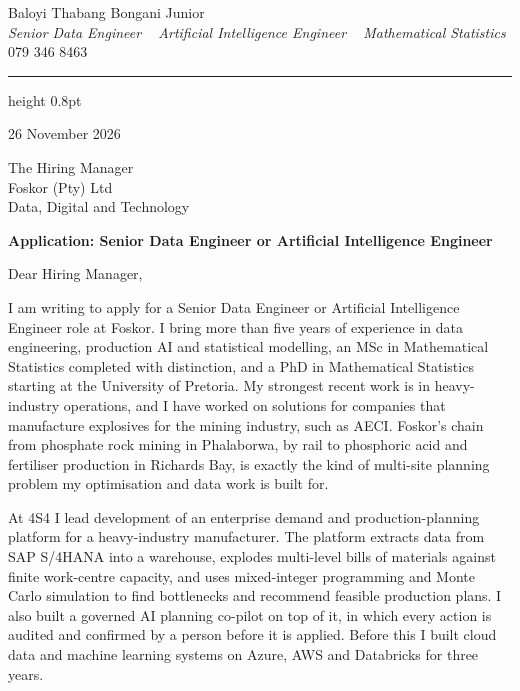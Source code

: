 \documentclass[a4paper,11pt]{article}
\begin{document}
\begin{center}
    {\huge Baloyi Thabang Bongani Junior} \\ \vspace{2pt}
    {\large\textit{Senior Data Engineer \textbar~ Artificial Intelligence Engineer \textbar~ Mathematical Statistics}} \\ \vspace{4pt}
    {079 346 8463} ~\textbar~
    \href{mailto:Baloyibongani1@gmail.com}{\color{blue}{Baloyibongani1@gmail.com}} ~\textbar~
    \href{https://www.linkedin.com/in/thabang-bongani-junior-baloyi-2622b0286/}{\color{blue}{LinkedIn}} ~\textbar~
    \href{https://github.com/thabangTheActuaryCoder}{\color{blue}{GitHub}}
\end{center}
{\color{airforceblue}\hrule height 0.8pt}

\vspace{6pt}
26 November 2026

The Hiring Manager \\
Foskor (Pty) Ltd \\
Data, Digital and Technology

\textbf{Application: Senior Data Engineer or Artificial Intelligence Engineer}

Dear Hiring Manager,

I am writing to apply for a Senior Data Engineer or Artificial Intelligence Engineer role at
Foskor. I bring more than five years of experience in data engineering, production AI and
statistical modelling, an MSc in Mathematical Statistics completed with distinction, and a PhD in
Mathematical Statistics starting at the University of Pretoria. My strongest recent work is in
heavy-industry operations, and I have worked on solutions for companies that manufacture explosives
for the mining industry, such as AECI. Foskor's chain from phosphate rock mining in Phalaborwa, by rail to phosphoric acid and fertiliser production in Richards Bay, is exactly the kind of multi-site planning problem my optimisation and data work is built for.

At 4S4 I lead development of an enterprise demand and production-planning platform for a
heavy-industry manufacturer. The platform extracts data from SAP S/4HANA into a warehouse, explodes multi-level
bills of materials against finite work-centre capacity, and uses mixed-integer programming
and Monte Carlo simulation to find bottlenecks and recommend feasible production plans. I also built a governed AI planning co-pilot on top
of it, in which every action is audited and confirmed by a person before it is applied. Before this I
built cloud data and machine learning systems on Azure, AWS and Databricks for three years.
\end{document}
